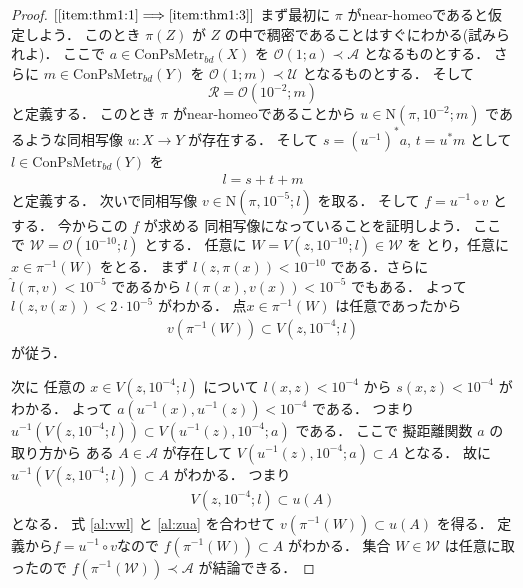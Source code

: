 \documentclass[leqno, a4paper, 12pt]{jsarticle}
\numberwithin{equation}{section}
\newcommand{\To}{\Longrightarrow}
\newcommand{\yocovfont}[1]{\mathscr{#1}}
\newcommand{\yofine}{\prec}
\newcommand{\yonbsetq}[3]{\mathrm{N}(#1, #2; #3)}
\newcommand{\yosupmet}[1]{\hat{#1}}
\newcommand{\yocbmet}[1]{\mathrm{ConPsMetr}_{bd}(#1)}
\newcommand{\yoball}[3]{V(#1, #2; #3)}
\newcommand{\yoballfam}[2]{\yocovfont{O}(#1; #2)}
\begin{document}
\begin{proof}
$[\ref{item:thm1:1}\To \ref{item:thm1:3}]$
まず最初に
$\pi$
がnear-homeoであると仮定しよう．
このとき
$\pi(Z)$
が
$Z$
の中で稠密であることはすぐにわかる(試みられよ)．
ここで
$a\in \yocbmet{X}$
を
$\yoballfam{1}{a}\yofine \yocovfont{A}$
となるものとする．
さらに
$m\in \yocbmet{Y}$
を
$\yoballfam{1}{m}\yofine \yocovfont{U}$
となるものとする．
そして
\[
\yocovfont{R}=\yoballfam{10^{-2}}{m}
\]
と定義する．
このとき
$\pi$
がnear-homeoであることから
$u\in \yonbsetq{\pi}{10^{-2}}{m}$
であるような同相写像
$u\colon X\to Y$
が存在する．
そして
$s=(u^{-1})^{*}a$,
$t=u^{*}m$
として
$l\in \yocbmet{Y}$
を
\begin{align}
l
=s+ t+m 
\end{align}
と定義する．
次いで同相写像
$v\in \yonbsetq{\pi}{10^{-5}}{l}$
を取る．
そして
$f=u^{-1}\circ v$
とする．
今からこの
$f$
が求める
同相写像になっていることを証明しよう．
ここで
$\yocovfont{W}=\yoballfam{10^{-10}}{l}$
とする．
任意に 
$W=\yoball{z}{10^{-10}}{l}\in \yocovfont{W}$
を
とり，任意に
$x\in \pi^{-1}(W)$
をとる．
まず
$l(z, \pi(x))<10^{-10}$
である．さらに
$\yosupmet{l}(\pi, v)<10^{-5}$
であるから
$l(\pi(x), v(x))<10^{-5}$
でもある．
よって
$l(z, v(x))<2\cdot 10^{-5}$
がわかる．
点$x\in \pi^{-1}(W)$
は任意であったから
\begin{align}\label{al:vwl}
v(\pi^{-1}(W))\subset \yoball{z}{10^{-4}}{l}
\end{align}
が従う．

次に
任意の
$x\in \yoball{z}{10^{-4}}{l}$
について
$l(x, z)<10^{-4}$
から
$s(x, z)<10^{-4}$
がわかる．
よって
$a(u^{-1}(x), u^{-1}(z))<10^{-4}$
である．
つまり
$u^{-1}(\yoball{z}{10^{-4}}{l})\subset 
\yoball{u^{-1}(z)}{10^{-4}}{a}$
である．
ここで
擬距離関数
$a$
の取り方から
ある
$A\in \yocovfont{A}$
が存在して
$\yoball{u^{-1}(z)}{10^{-4}}{a}\subset A$
となる．
故に
$u^{-1}(\yoball{z}{10^{-4}}{l})\subset A$
がわかる．
つまり
\begin{align}\label{al:zua}
\yoball{z}{10^{-4}}{l}\subset u(A)
\end{align}
となる．
式
\eqref{al:vwl}
と
\eqref{al:zua}
を合わせて
$v(\pi^{-1}(W))\subset u(A)$
を得る．
定義から$f=u^{-1}\circ v$なので
$f(\pi^{-1}(W))\subset A$
がわかる．
集合
$W\in \yocovfont{W}$
は任意に取ったので
$f(\pi^{-1}(\yocovfont{W}))\yofine \yocovfont{A}$
が結論できる．


\end{proof}
\end{document}
